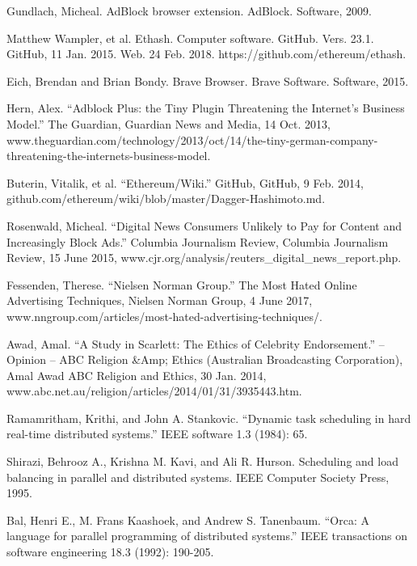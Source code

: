 \documentclass[runningheads]{llncs}
\begin{document}
\begin{thebibliography}{1}
 Gundlach, Micheal. AdBlock browser extension. AdBlock. Software, 2009.

Matthew Wampler, et al. Ethash. Computer software. GitHub. Vers. 23.1. GitHub, 11 Jan. 2015. Web. 24 Feb. 2018. https://github.com/ethereum/ethash. 

 Eich, Brendan and Brian Bondy. Brave Browser. Brave Software. Software, 2015.

 Hern, Alex. ``Adblock Plus: the Tiny Plugin Threatening the Internet's Business Model.'' The Guardian, Guardian News and Media, 14 Oct. 2013, www.theguardian.com/technology/2013/oct/14/the-tiny-german-company-threatening-the-internets-business-model.

 Buterin, Vitalik, et al. ``Ethereum/Wiki.'' GitHub, GitHub, 9 Feb. 2014, github.com/ethereum/wiki/blob/master/Dagger-Hashimoto.md. 

 Rosenwald, Micheal. ``Digital News Consumers Unlikely to Pay for Content and Increasingly Block Ads.'' Columbia Journalism Review, Columbia Journalism Review, 15 June 2015, www.cjr.org/analysis/reuters\_digital\_news\_report.php.

 Fessenden, Therese. ``Nielsen Norman Group.'' The Most Hated Online Advertising Techniques, Nielsen Norman Group, 4 June 2017, www.nngroup.com/articles/most-hated-advertising-techniques/.

 Awad, Amal. ``A Study in Scarlett: The Ethics of Celebrity Endorsement.'' – Opinion – ABC Religion \&Amp; Ethics (Australian Broadcasting Corporation), Amal Awad ABC Religion and Ethics, 30 Jan. 2014, www.abc.net.au/religion/articles/2014/01/31/3935443.htm.

Ramamritham, Krithi, and John A. Stankovic. ``Dynamic task scheduling in hard real-time distributed systems.'' IEEE software 1.3 (1984): 65.

Shirazi, Behrooz A., Krishna M. Kavi, and Ali R. Hurson. Scheduling and load balancing in parallel and distributed systems. IEEE Computer Society Press, 1995.

Bal, Henri E., M. Frans Kaashoek, and Andrew S. Tanenbaum. ``Orca: A language for parallel programming of distributed systems.'' IEEE transactions on software engineering 18.3 (1992): 190-205.


\end{thebibliography}
\end{document}
